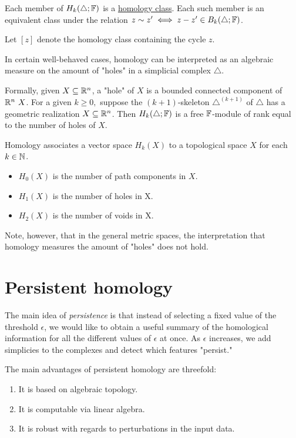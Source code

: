 \begin{defn}
Each member of $H_k(\triangle;\mathbb{F})$ is a \underline{homology class}. Each such member is an equivalent class under the relation $z\sim z^\prime \iff z -z^\prime \in B_k(\triangle;\mathbb{F})$. 

Let $[z]$ denote the homology class containing the cycle $z$. 
\end{defn}

\begin{defn}
In certain well-behaved cases, homology can be interpreted as an algebraic measure on the amount of "holes" in a simplicial complex $\triangle$.

Formally, given $X\subseteq \mathbb R^n$, a "hole" of $X$ is a bounded connected component of $\RR^n\ X$. For a given $k\geq 0,$ suppose the $(k+1)$-skeleton $\triangle^{(k+1)}$ of $\triangle$ has a geometric realization $X \subseteq \mathbb R^n$. Then $H_k(\triangle;\mathbb{F})$ is a free $\mathbb{F}$-module of rank equal to the number of holes of $X$. 

Homology associates a vector space $H_k(X)$ to a topological space $X$ for each $k\in \mathbb N$.
\begin{itemize}
    \item $H_0(X)$ is the number of path components in $X$.
    \item $H_1(X)$ is the number of holes in X.
    \item $H_2(X)$ is the number of voids in X.
\end{itemize}
\begin{rmk}
Note, however, that in the general metric spaces, the interpretation that homology measures the amount of "holes" does not hold.
\end{rmk}
\end{defn}

\section{Persistent homology}

The main idea of \textit{persistence} is that instead of selecting a fixed value of the threshold $\epsilon$, we would like to obtain a useful summary of the homological information for all the different values of $\epsilon$ at once. As $\epsilon$ increases, we add simplicies to the complexes and detect which features "persist."

The main advantages of persistent homology are threefold: 
\begin{enumerate}
    \item It is based on algebraic topology.
    \item It is computable via linear algebra.
    \item It is robust with regards to perturbations in the input data. 
\end{enumerate}

